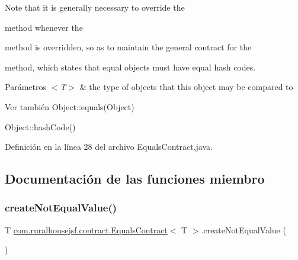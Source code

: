 Note that it is generally necessary to override the
\begin{DoxyCode}{0}
\end{DoxyCode}
 method whenever the
\begin{DoxyCode}{0}
\end{DoxyCode}
 method is overridden, so as to maintain the general contract for the
\begin{DoxyCode}{0}
\end{DoxyCode}
 method, which states that equal objects must have equal hash codes.


\begin{DoxyParams}{Parámetros}
{\em $<$\+T$>$} & the type of objects that this object may be compared to\\
\hline
\end{DoxyParams}
\begin{DoxySeeAlso}{Ver también}
Object\+::equals(\+Object) 

Object\+::hash\+Code() 
\end{DoxySeeAlso}


Definición en la línea 28 del archivo Equals\+Contract.\+java.



\subsection{Documentación de las funciones miembro}
\mbox{\label{interfacecom_1_1ruralhousejsf_1_1contract_1_1_equals_contract_a65840509b57f6b89e42e2abf1978aa01}} 
\subsubsection{\texorpdfstring{createNotEqualValue()}{createNotEqualValue()}}
{\footnotesize\ttfamily T \mbox{\hyperlink{interfacecom_1_1ruralhousejsf_1_1contract_1_1_equals_contract}{com.\+ruralhousejsf.\+contract.\+Equals\+Contract}}$<$ T $>$.create\+Not\+Equal\+Value (\begin{DoxyParamCaption}{ }\end{DoxyParamCaption})}



